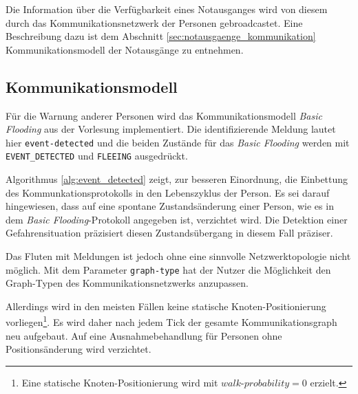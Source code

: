 Die Information über die Verfügbarkeit eines Notausganges wird von diesem durch das Kommunikationsnetzwerk der Personen gebroadcastet. Eine Beschreibung dazu ist dem Abschnitt \ref{sec:notausgaenge_kommunikation} Kommunikationsmodell der Notausgänge zu entnehmen.

\subsection{Kommunikationsmodell}
\label{sec:kommunikationsmodell}

Für die Warnung anderer Personen wird das Kommunikationsmodell \emph{Basic Flooding} aus der Vorlesung implementiert. Die identifizierende Meldung lautet hier \verb|event-detected| und die beiden Zustände für das \emph{Basic Flooding} werden mit \verb|EVENT_DETECTED| und \verb|FLEEING| ausgedrückt. 

Algorithmus \ref{alg:event_detected} zeigt, zur besseren Einordnung, die Einbettung des Kommunkationsprotokolls in den Lebenszyklus der Person. Es sei darauf hingewiesen, dass auf eine spontane Zustandsänderung einer Person, wie es in dem \emph{Basic Flooding}-Protokoll angegeben ist, verzichtet wird. Die Detektion einer Gefahrensituation präzisiert diesen Zustandsübergang in diesem Fall präziser.

Das Fluten mit Meldungen ist jedoch ohne eine sinnvolle Netzwerktopologie nicht möglich. Mit dem Parameter \verb|graph-type| hat der Nutzer die Möglichkeit den Graph-Typen des Kommunikationsnetzwerks anzupassen. 

Allerdings wird in den meisten Fällen keine statische Knoten-Positionierung vorliegen\footnote{Eine statische Knoten-Positionierung wird mit $walk$-$probability = 0$ erzielt.}. Es wird daher nach jedem Tick der gesamte Kommunikationsgraph neu aufgebaut. Auf eine Ausnahmebehandlung für Personen ohne Positionsänderung wird verzichtet.

